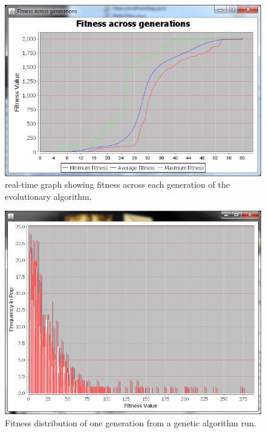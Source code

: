 \documentclass[12pt]{article}
\begin{document}
\begin{figure} [ht]
\centering
\includegraphics[scale = 0.6]{nicegraph.png}
\caption{real-time graph showing fitness across each generation of the evolutionary algorithm.}
\label{fig:nicegraph}
\end{figure}

\begin{figure} [ht]
\centering
\includegraphics[scale = 0.75]{gen0-2500.png}
\caption{Fitness distribution of one generation from a genetic algorithm run.}
\label{fig:graph2500}
\end{figure}
\end{document}
